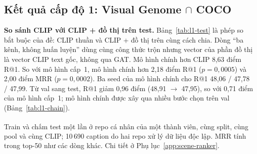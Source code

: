 \subsection{Kết quả cấp độ 1: Visual Genome $\cap$ COCO}
\label{sec:l1}

\textbf{So sánh CLIP với CLIP + đồ thị trên test.}
Bảng~\ref{tab:l1-test} là phép so bắt buộc của đề: CLIP thuần và CLIP + đồ thị trên cùng cách chia. Dòng ``ba kênh, không
huấn luyện'' dùng cùng công thức trộn nhưng vector của phần đồ thị là vector CLIP text gốc, không qua GAT. Mô hình chính hơn
CLIP 8,63 điểm R@1. So với mô hình cấp~1, mô hình chính hơn 2,18 điểm R@1 ($p = 0{,}0005$) và 2,00 điểm MRR
($p = 0{,}0002$). Ba seed của mô hình chính cho R@1 48,06 / 47,78 / 47,99. Từ val sang test, R@1 giảm 0,96 điểm (48,91
$\to$ 47,95), so với 0,71 điểm của mô hình cấp~1; mô hình chính được xây qua nhiều bước chọn trên val
(Bảng~\ref{tab:l1-chain}).

\begin{table}[t]
\centering
\caption{Kết quả trên test VG $\cap$ COCO (10\,696 truy vấn, pool 2\,138 ảnh). Test chấm một lần cho mỗi mô hình đã chốt.}
\label{tab:l1-test}
\footnotesize
\setlength{\tabcolsep}{3pt}
\par\smallskip
{\scriptsize\raggedright \textsuperscript{\dag}Train và chấm test một lần ở repo cá nhân của một thành viên, cùng split,
cùng pool và cùng CLIP; 10\,690 caption do hai repo xử lý dữ liệu độc lập. MRR tính trong top-50 như các dòng khác.
Chi tiết ở Phụ lục~\ref{app:scene-ranker}.\par}
\end{table}

